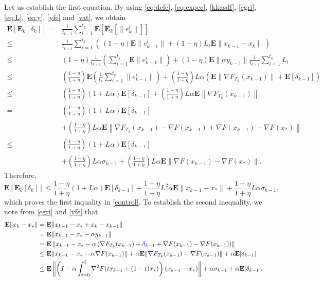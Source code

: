 \documentclass[11pt]{article}
\newcommand{\E}{\mathbf{E}}
\begin{document}
Let us establish the first equation.
By using \eqref{eq:defe}, \eqref{eq:expec}, \eqref{kkasdf},  \eqref{egri}, \eqref{eq:L}, \eqref{eq:y}, \eqref{yfe} and \eqref{vat}, we obtain
\small
\begin{align*}
 \E[\E_k[\delta_k]]  = &\frac{1}{t_{k+1}}\sum_{i=1}^{t_k} \E[\E_k[\|e_k^i\|]] \\
 \leq &  \frac{1}{t_{k+1}}\sum_{i=1}^{t_k} \left(\, (1-\eta)\E\|e_{k-1}^i\| + (1-\eta)L_i \E\|x_{k-1} - x_k\| \, \right)\\
 \leq  &(1-\eta)\frac{1}{t_{k+1}}\left(\sum_{i=1}^{t_k}\E\|e_{k-1}^i\|\right) +   (1-\eta) \E\|\alpha y_{k-1}\| \frac{1}{t_{k+1}}\sum_{i=1}^{t_k}L_i\\
 \leq  &{\left(\frac{1-\eta}{1+\eta}\right)}\E\left(\frac{1}{t_k}\sum_{i=1}^{t_k}\|e_{k-1}^i\|\right) + {\left(\frac{1-\eta}{1+\eta}\right)} L \alpha\left(\E\|\nabla F_{T_k}(x_{k-1})\| + \E[\delta_{k-1}]\right) \\
 \leq  &{\left(\frac{1-\eta}{1+\eta}\right)}\left(1 + L\alpha \right)\E[\delta_{k-1}] + {\left(\frac{1-\eta}{1+\eta}\right)}L\alpha\E\left\|\nabla F_{T_k}(x_{k-1})\right\|\\
  = &{\left(\frac{1-\eta}{1+\eta}\right)}\left(1 + L\alpha \right)\E[\delta_{k-1}] \\
 &+ {\left(\frac{1-\eta}{1+\eta}\right)}L\alpha\E\left\|\nabla F_{T_k}(x_{k-1})-\nabla F(x_{k-1})+\nabla F(x_{k-1})-\nabla F(x_\ast)\right\|\\
  \leq &{\left(\frac{1-\eta}{1+\eta}\right)}\left(1 + L\alpha \right)\E[\delta_{k-1}] \\
 &+ {\left(\frac{1-\eta}{1+\eta}\right)}L\alpha\sigma_{k-1} + {\left(\frac{1-\eta}{1+\eta}\right)}L\alpha\E\|\nabla F(x_{k-1})-\nabla F(x_\ast)\| .
\end{align*}
\normalsize
Therefore,
\begin{equation}\label{eq:row1}
 \E[\E_k[\delta_k]] \leq \frac{1-\eta}{1+\eta}\left(1 + L\alpha \right)\E[\delta_{k-1}]+  \frac{1-\eta}{1+\eta}L^2\alpha\E\|x_{k-1}-x_\ast\| + \frac{1-\eta}{1+\eta}L\alpha\sigma_{k-1} ,
\end{equation}
which proves the first inquality in \eqref{control}. To establish the second inequality, we note from \eqref{egri} and \eqref{yfe} that
 \begin{align*}
   \E\|x_k-x_\ast\| &= \E\|x_{k-1}-x_\ast + x_k-x_{k-1}\|\\
   &= \E\|x_{k-1}-x_\ast -\alpha y_{k-1}\|\\
   &= \E\left\|x_{k-1}-x_\ast -\alpha \left(\nabla F_{T_k}(x_{k-1}) +{\color{blue} \delta_{k-1}} + \nabla F(x_{k-1})-\nabla F(x_{k-1})\right)\right\|\\  
%   
%   
   &\leq \E\|x_{k-1}-x_\ast -\alpha\nabla F(x_{k-1})\| + \alpha\E\|\nabla F_{T_k}(x_{k-1}) -\nabla F(x_{k-1})\| + \alpha \E[\delta_{k-1}]\\
   &\leq\E\left\|\left(I-\alpha\int_{t=0}^1 \nabla^2 F(tx_{k-1}+(1-t)x_\ast)\right)(x_{k-1}-x_\ast)\right\| + \alpha\sigma_{k-1} + \alpha \E[\delta_{k-1}]. 
 \end{align*}
\end{document}
